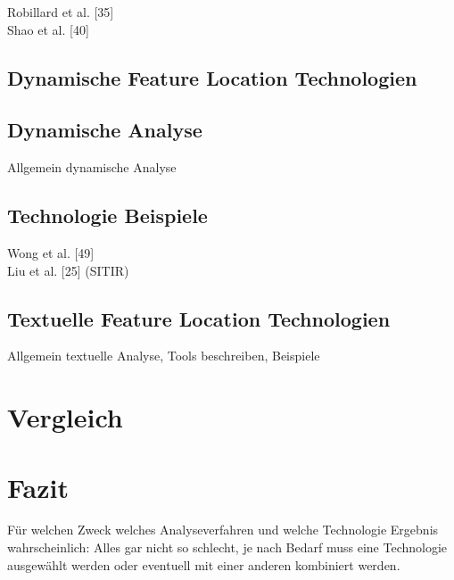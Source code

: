 \documentclass[runningheads,a4paper]{llncs}
\begin{document}
Robillard et al. [35]\\
Shao et al. [40]

\subsection{Dynamische Feature Location Technologien}

\subsection*{Dynamische Analyse}
Allgemein dynamische Analyse

\subsection*{Technologie Beispiele}
Wong et al. [49]\\
Liu et al. [25] (SITIR)

\subsection{Textuelle Feature Location Technologien}
Allgemein textuelle Analyse, Tools beschreiben, Beispiele

\section{Vergleich}

\section{Fazit}
Für welchen Zweck welches Analyseverfahren und welche Technologie
Ergebnis wahrscheinlich: Alles gar nicht so schlecht, je nach Bedarf muss eine Technologie ausgewählt werden oder eventuell mit einer anderen kombiniert werden.




\clearpage

\end{document}
